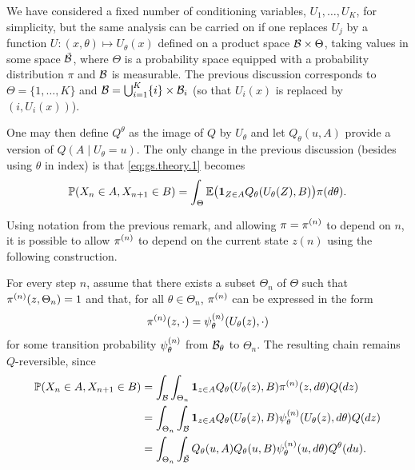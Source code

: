 \begin{remark}
\label{rem:gibbs.sampling.2}
We have considered a fixed number of conditioning variables, $U_1, \ldots, U_K$, for simplicity, but the same analysis can be carried on if one replaces $U_j$ by a function $U: (x, \theta)\mapsto U_\theta (x)$ defined on a product space ${\mathcal B}\times \Theta$, taking values in some space $\tilde {{\mathcal B}}$, where $\Theta$ is a probability space equipped with a probability distribution $\pi$ and ${\mathcal B}$ is measurable.  The previous discussion corresponds to $\Theta = \{1, \ldots, K\}$ and ${\mathcal B} = \bigcup_{i=1}^K \{i\}\times {\mathcal B}_i$ (so that $U_i(x)$ is replaced by $(i, U_i(x))$).

One may then define $Q^\theta$ as the image of $Q$ by $U_\theta$ and let $Q_\theta(u, A)$ provide a version of $Q(A\mid U_\theta = u)$. The only change in the previous discussion (besides using $\theta$ in index) is that \cref{eq:gs.theory.1} becomes 
\[
\bm{\mathbb P}(X_n\in A, X_{n+1}\in B) = \int_\Theta \bm{\mathbb E}\big({\bm 1}_{Z\in A} Q_\theta(U_\theta(Z), B)\big) \pi(d\theta).
\]
\end{remark}

\begin{remark}
\label{rem:gibbs.sampling.3}
Using notation from the previous remark, and allowing $\pi=\pi^{(n)}$ to depend on $n$, it is possible to allow $\pi^{(n)}$ to depend on the current state $z(n)$ using the following construction.


For every step $n$, assume that  there exists a subset $\Theta_n$ of $\Theta$ such that  
$ \pi^{(n)}(z, \Theta_n) = 1$ and that, for all $\theta\in \Theta_n$, $\pi^{(n)}$ can be expressed in the form
\[
\pi^{(n)}(z,\cdot) = \psi^{(n)}_\theta(U_\theta(z), \cdot)
\]
for some transition probability $\psi^{(n)}_\theta$ from ${\mathcal B}_\theta$ to $\Theta_n$. The resulting chain remains $Q$-reversible, since
\begin{align*}
\bm{\mathbb P}(X_n\in A, X_{n+1}\in B) &= \int_{{\mathcal B}} \int_{\Theta_n} {\bm 1}_{z\in A} Q_\theta(U_\theta(z), B) \pi^{(n)}(z, d\theta) Q(dz)\\
&= \int_{\Theta_n} \int_{{\mathcal B}} {\bm 1}_{z\in A} Q_\theta(U_\theta(z), B) \psi_\theta^{(n)}(U_\theta(z), d\theta) Q(dz)\\
&= \int_{\Theta_n} \int_{\tilde {{\mathcal B}}} Q_\theta(u, A) Q_\theta(u, B) \psi^{(n)}_\theta(u, d\theta) Q^\theta(du).
\end{align*}


\end{remark}


